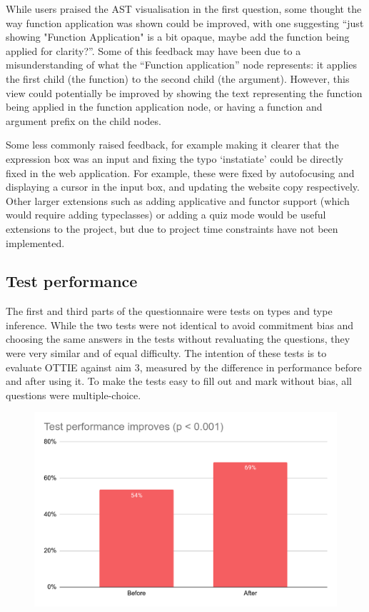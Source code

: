 \documentclass[a4paper,fleqn,oneside,12pt]{report}
\begin{document}
While users praised the AST visualisation in the first question, some thought the way function application was shown could be improved, with one suggesting “just showing "Function Application" is a bit opaque, maybe add the function being applied for clarity?”. Some of this feedback may have been due to a misunderstanding of what the “Function application” node represents: it applies the first child (the function) to the second child (the argument). However, this view could potentially be improved by showing the text representing the function being applied in the function application node, or having a function and argument prefix on the child nodes.

Some less commonly raised feedback, for example making it clearer that the expression box was an input and fixing the typo ‘instatiate’ could be directly fixed in the web application. For example, these were fixed by autofocusing and displaying a cursor in the input box, and updating the website copy respectively. Other larger extensions such as adding applicative and functor support (which would require adding typeclasses) or adding a quiz mode would be useful extensions to the project, but due to project time constraints have not been implemented.

\subsection{Test performance}\label{id:h.cn0p90nrqrmi}

The first and third parts of the questionnaire were tests on types and type inference. While the two tests were not identical to avoid commitment bias and choosing the same answers in the tests without revaluating the questions, they were very similar and of equal difficulty. The intention of these tests is to evaluate OTTIE against aim 3, measured by the difference in performance before and after using it. To make the tests easy to fill out and mark without bias, all questions were multiple-choice.

{\centering \begin{figure}[h!]
  \centering
  \includegraphics[width=0.85\linewidth]{images/image23.png}
  \label{figure:evaluation_testperformanceimproves}
\end{figure} \par}
\end{document}
